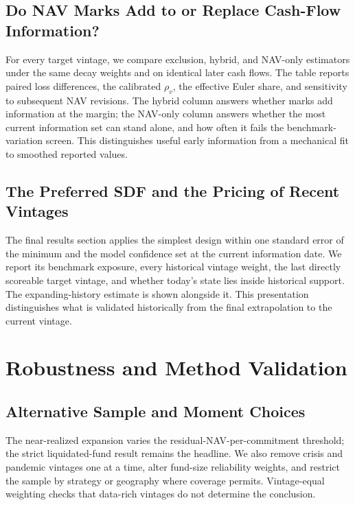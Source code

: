 \documentclass[11pt]{article}
\begin{document}
\subsection{Do NAV Marks Add to or Replace Cash-Flow Information?}

For every target vintage, we compare exclusion, hybrid, and NAV-only
estimators under the same decay weights and on identical later cash flows.
The table reports paired loss differences, the calibrated $\rho_v$, the
effective Euler share, and sensitivity to subsequent NAV revisions. The
hybrid column answers whether marks add information at the margin; the
NAV-only column answers whether the most current information set can stand
alone, and how often it fails the benchmark-variation screen. This
distinguishes useful early information from a mechanical fit to smoothed
reported values.

\subsection{The Preferred SDF and the Pricing of Recent Vintages}

The final results section applies the simplest design within one standard
error of the minimum and the model confidence set at the current information
date. We report its benchmark exposure, every historical vintage weight, the
last directly scoreable target vintage, and whether today's state lies inside
historical support. The expanding-history estimate is shown alongside it. This
presentation distinguishes what is validated historically from the final
extrapolation to the current vintage.

\section{Robustness and Method Validation}

\subsection{Alternative Sample and Moment Choices}

The near-realized expansion varies the residual-NAV-per-commitment threshold;
the strict liquidated-fund result remains the headline. We also remove crisis
and pandemic vintages one at a time, alter fund-size reliability weights, and
restrict the sample by strategy or geography where coverage permits.
Vintage-equal weighting checks that data-rich vintages do not determine the
conclusion.
\end{document}

